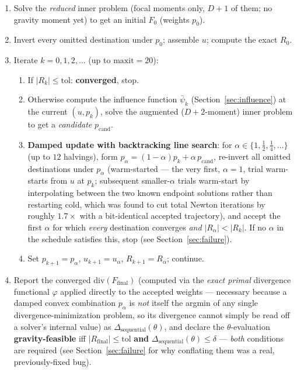 \documentclass[11pt]{article}
\begin{document}
\begin{enumerate}[label=\arabic*.]
  \item Solve the \emph{reduced} inner problem (focal moments only, $D+1$ of them; no gravity
  moment yet) to get an initial $F_0$ (weights $p_0$).
  \item Invert every omitted destination under $p_0$; assemble $u$; compute the exact $R_0$.
  \item Iterate $k=0,1,2,\dots$ (up to $\mathrm{maxit}=20$):
  \begin{enumerate}[label=(\alph*)]
    \item If $|R_k|\le\mathrm{tol}$: \textbf{converged}, stop.
    \item Otherwise compute the influence function $\bar\psi_k$ (Section~\ref{sec:influence}) at
    the current $(u,p_k)$, solve the augmented ($D+2$-moment) inner problem to get a
    \emph{candidate} $p_{\text{cand}}$.
    \item \textbf{Damped update with backtracking line search}: for $\alpha\in\{1,\tfrac12,\tfrac14,\dots\}$
    (up to $12$ halvings), form $p_\alpha=(1-\alpha)p_k+\alpha\,p_{\text{cand}}$, re-invert all
    omitted destinations under $p_\alpha$ (warm-started — the very first, $\alpha=1$, trial warm-starts
    from $u$ at $p_k$; subsequent smaller-$\alpha$ trials warm-start by interpolating between the
    two known endpoint solutions rather than restarting cold, which was found to cut total Newton
    iterations by roughly $1.7\times$ with a bit-identical accepted trajectory), and accept the
    first $\alpha$ for which \emph{every} destination converges \emph{and} $|R_\alpha|<|R_k|$. If no
    $\alpha$ in the schedule satisfies this, stop (see Section~\ref{sec:failure}).
    \item Set $p_{k+1}=p_\alpha$, $u_{k+1}=u_\alpha$, $R_{k+1}=R_\alpha$; continue.
  \end{enumerate}
  \item Report the converged $\mathrm{div}(F_{\text{final}})$ (computed via the \emph{exact primal}
  divergence functional $\varphi$ applied directly to the accepted weights — necessary because a
  damped convex combination $p_\alpha$ is \emph{not} itself the argmin of any single
  divergence-minimization problem, so its divergence cannot simply be read off a solver's internal
  value) as $\Delta_{\text{sequential}}(\theta)$, and declare the $\theta$-evaluation
  \textbf{gravity-feasible} iff $|R_{\text{final}}|\le\mathrm{tol}$ \textbf{and}
  $\Delta_{\text{sequential}}(\theta)\le\delta$ — \emph{both} conditions are required (see
  Section~\ref{sec:failure} for why conflating them was a real, previously-fixed bug).
\end{enumerate}
\end{document}
